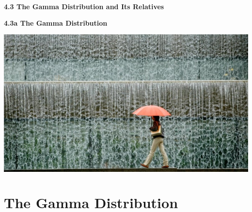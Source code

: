 \section{}

\begin{frame}
  
  \begin{center}
    \Large{\textbf{4.3 The Gamma Distribution and Its Relatives}}
  \end{center}
  
  \bigskip
  
  
\end{frame}

\begin{frame}
  
  \begin{center}
    \Large{\textbf{4.3a The Gamma Distribution}}
  \end{center}
  
  \bigskip
  
  \begin{center}
    \includegraphics[height=.5\textheight]{figure/weather-vancouver}
  \end{center}
\end{frame}

\section{The Gamma Distribution}

